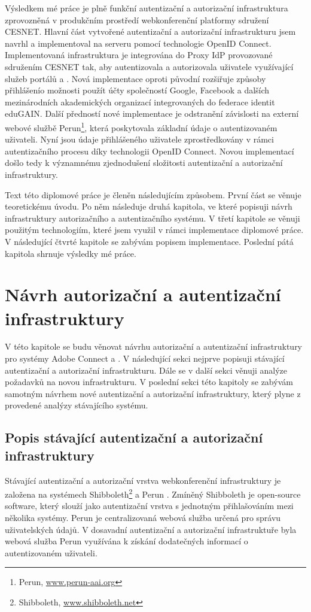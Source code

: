 \documentclass[
  printed, %
  twoside, %
  table,   %
  nolof,     %
  nolot,     %
]{fithesis3}
\begin{document}
Výsledkem mé práce je plně funkční autentizační a autorizační infrastruktura zprovozněná v produkčním prostředí webkonferenční platformy sdružení CESNET. Hlavní část vytvořené autentizační a autorizační infrastrukturu jsem navrhl a implementoval na serveru  pomocí technologie OpenID Connect. Implementovaná infrastruktura je integrována do Proxy IdP provozované sdružením CESNET tak, aby autentizovala a autorizovala uživatele využívající služeb portálů  a . Nová implementace oproti původní rozšiřuje způsoby přihlášení\break o možnosti použít účty společností Google, Facebook a dalších mezinárodních akademických organizací integrovaných do federace identit eduGAIN. Další předností nové implementace je odstranění závislosti na externí webové službě Perun\footnote{Perun, \url{www.perun-aai.org}}, která poskytovala základní údaje o autentizovaném uživateli. Nyní jsou údaje přihlášeného uživatele zprostředkovány v rámci autentizačního procesu díky technologii OpenID Connect. Novou implementací došlo tedy k významnému zjednodušení složitosti autentizační a autorizační infrastruktury. \par

Text této diplomové práce je členěn následujícím způsobem. První část se věnuje teoretickému úvodu. Po něm následuje druhá kapitola, ve které popisuji návrh infrastruktury autorizačního a autentizačního systému. V třetí kapitole se věnuji použitým technologiím, které jsem využil v rámci implementace diplomové práce. V následující čtvrté kapitole se zabývám popisem implementace. Poslední pátá kapitola shrnuje výsledky mé práce. 

\chapter{Návrh autorizační a autentizační infrastruktury}
V této kapitole se budu věnovat návrhu autorizační a autentizační infrastruktury pro systémy Adobe Connect a . V následující sekci nejprve popisuji stávající autentizační a autorizační infrastrukturu. Dále se v další sekci věnuji analýze požadavků na novou infrastrukturu. V poslední sekci této kapitoly se zabývám samotným návrhem nové autentizační a autorizační infrastruktury, který plyne z provedené analýzy stávajícího systému.    

\section{Popis stávající autentizační a autorizační infrastruktury}
Stávající autentizační a autorizační vrstva webkonferenční infrastruktury je založena na systémech Shibboleth\footnote{Shibboleth, \url{www.shibboleth.net}} a Perun \cite{perunPresentation}. Zmíněný Shibboleth je open-source software, který slouží jako autentizační vrstva s jednotným přihlašováním mezi několika systémy. Perun je centralizovaná webová služba určená pro správu uživatelských údajů. V dosavadní autentizační a autorizační infrastruktuře byla webová služba Perun využívána k získání dodatečných informací o autentizovaném uživateli. \par
\end{document}
